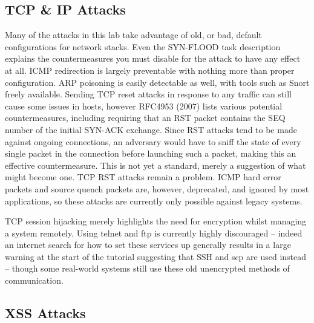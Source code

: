 \subsection{TCP \& IP Attacks}

Many of the attacks in this lab take advantage of old, or bad, default configurations for network stacks. Even the
SYN-FLOOD task description explains the countermeasures you must disable for the attack to have any effect at all. ICMP
redirection is largely preventable with nothing more than proper configuration\cite{sysctl}.
ARP poisoning is easily detectable as well, with tools such as Snort freely available\cite{snort}\cite{snort_arp}.
Sending TCP reset attacks in response to any traffic can still cause some issues in hosts, however RFC4953 (2007) lists
various potential countermeasures, including requiring that an RST packet contains the SEQ number of the initial SYN-ACK
exchange. Since RST attacks tend to be made against ongoing connections, an adversary would have to sniff the state of
every single packet in the connection before launching such a packet, making this an effective countermeasure. This is
not yet a standard, merely a suggestion of what might become one. TCP RST attacks remain a problem. ICMP hard error
packets and source quench packets are, however, deprecated, and ignored by most applications, so these attacks are
currently only possible against legacy systems.

TCP session hijacking merely highlights the need for encryption whilst managing a system remotely. Using telnet and ftp
is currently highly discouraged -- indeed an internet search for how to set these services up generally results in a
large warning at the start of the tutorial suggesting that SSH and scp are used instead -- though some real-world
systems still use these old unencrypted methods of communication.

\subsection{XSS Attacks}

